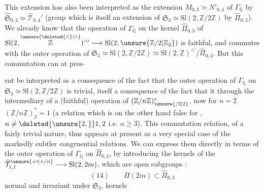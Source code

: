 This extension  has also been interpreted
as the extension $M_{0,3}\simeq N'_{0,4}$ of
$\Gamma_{\mathbb Q}$ by
$\widehat{\mathfrak S}_{0,3}
\simeq\widehat{\mathcal T}_{0,4}'$
(group which is itself an extension of
$\mathfrak S_3\simeq\mathrm{Sl}(2,\mathbb Z/2\mathbb Z)$
by $\widehat{\Pi}_{0,3}$).
We already know that the  operation of $\Gamma_{\mathbb Q}$
on the kernel $\widehat{\Pi}_{0,3}$ of
$\mathrm{Sl}(2,\overset{\unsure{\deleted{\wedge}|\wedge}}{\mathbb Z})^{\wedge\prime}
\longrightarrow\mathrm{Sl}(2,\unsure{\mathbb Z/2|\mathbb Z_{2}})$
is faithful, and commutes with the outer operation of
$\mathfrak S_3\simeq\mathrm{Sl}(2,\mathbb Z/2\mathbb Z)
\simeq\mathrm{Sl}(2,\mathbb Z)^{\wedge\prime}/\widehat{\Pi}_{0,3}$.
But this commutation can at pres-

ent be interpreted as a consequence of the fact that the outer operation of $\Gamma_{\mathbb Q}$ on $\mathfrak S_3\simeq \mathrm{Sl}(2,\mathbb Z/2\mathbb Z)$ is trivial, itself  a consequence of the fact that it  through the intermediary of a (faithful) operation of $(\mathbb Z/n\mathbb Z)^*_{\unsure{/2|2}}$, now for $n=2$ $(\mathbb Z/n\mathbb Z)^*_2=1$ (a relation which is on the other hand false for   , $n\neq\deleted{\unsure{2,}}1,2$ i.e. $n\geq3$). This commutation relation, of a fairly trivial nature, thus appears at present as a very special case of the markedly subtler congruential relations. We can  express them   directly in terms of the outer operation of $\Gamma_{\mathbb Q}$ on $\widehat\Pi_{0,3}$, by introducing the kernels of the  $\widehat{\mathcal T}_{1,1}^{\unsure{+\prime|+/n}}\longrightarrow \mathrm{Sl}(2,2m)$, which are open subgroups  :
\[
(14)\qquad \Pi(2m)\subset\widehat\Pi_{0,3}
\]
normal and invariant under $\mathfrak S_3$, kernels

